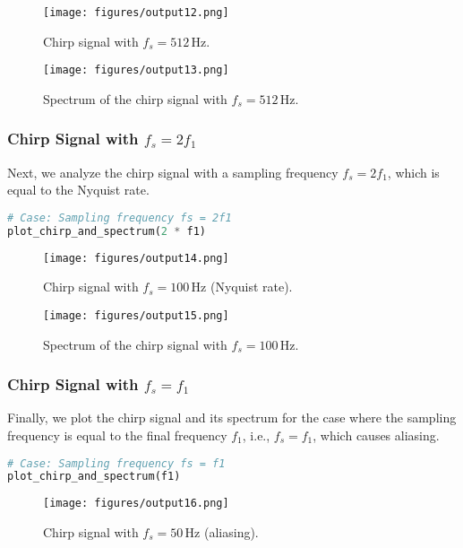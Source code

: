 \documentclass[10pt]{article}
\theoremstyle{definition}
\theoremstyle{remark}
\theoremstyle{definition}
\numberwithin{equation}{prob}
\begin{document}
\begin{figure}[H]
    \centering
    \texttt{[image: figures/output12.png]}  
    \caption{Chirp signal with \( f_s = 512 \, \text{Hz} \).}
\end{figure}

\begin{figure}[H]
    \centering
    \texttt{[image: figures/output13.png]}  
    \caption{Spectrum of the chirp signal with \( f_s = 512 \, \text{Hz} \).}
\end{figure}

\subsubsection{Chirp Signal with \( f_s = 2f_1 \)}
Next, we analyze the chirp signal with a sampling frequency \( f_s = 2f_1 \), which is equal to the Nyquist rate.

\begin{lstlisting}[language=Python]
# Case: Sampling frequency fs = 2f1
plot_chirp_and_spectrum(2 * f1)
\end{lstlisting}

\begin{figure}[H]
    \centering
    \texttt{[image: figures/output14.png]} 
    \caption{Chirp signal with \( f_s = 100 \, \text{Hz} \) (Nyquist rate).}
\end{figure}

\begin{figure}[H]
    \centering
    \texttt{[image: figures/output15.png]}  
    \caption{Spectrum of the chirp signal with \( f_s = 100 \, \text{Hz} \).}
\end{figure}

\subsubsection{Chirp Signal with \( f_s = f_1 \)}
Finally, we plot the chirp signal and its spectrum for the case where the sampling frequency is equal to the final frequency \( f_1 \), i.e., \( f_s = f_1 \), which causes aliasing.

\begin{lstlisting}[language=Python]
# Case: Sampling frequency fs = f1
plot_chirp_and_spectrum(f1)
\end{lstlisting}

\begin{figure}[H]
    \centering
    \texttt{[image: figures/output16.png]}  
    \caption{Chirp signal with \( f_s = 50 \, \text{Hz} \) (aliasing).}
\end{figure}
\end{document}
